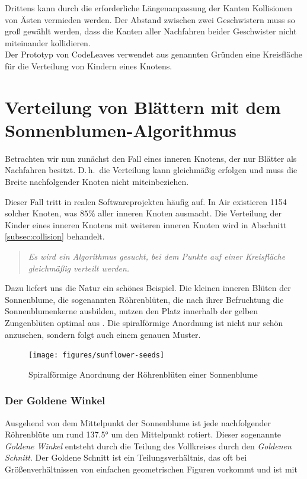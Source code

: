 Drittens kann durch die erforderliche Längenanpassung der Kanten Kollisionen von Ästen vermieden werden. Der Abstand zwischen zwei Geschwistern muss so groß gewählt werden, dass die Kanten aller Nachfahren beider Geschwister nicht miteinander kollidieren.\\

Der Prototyp von CodeLeaves verwendet aus genannten Gründen eine Kreisfläche für die Verteilung von Kindern eines Knotens.

\section{Verteilung von Blättern mit dem Sonnenblumen-Algorithmus}
\label{sec:sunflower}

Betrachten wir nun zunächst den Fall eines inneren Knotens, der nur Blätter als Nachfahren besitzt. D.\,h.\ die Verteilung kann gleichmäßig erfolgen und muss die Breite nachfolgender Knoten nicht miteinbeziehen.

Dieser Fall tritt in realen Softwareprojekten häufig auf. In Air existieren 1154 solcher Knoten, was $85\%$ aller inneren Knoten ausmacht. Die Verteilung der Kinder eines inneren Knotens mit weiteren inneren Knoten wird in Abschnitt \ref{subsec:collision} behandelt.

\begin{quote}
  \textit{Es wird ein Algorithmus gesucht, bei dem Punkte auf einer Kreisfläche gleichmäßig verteilt werden.}
\end{quote}

Dazu liefert uns die Natur ein schönes Beispiel. Die kleinen inneren Blüten der Sonnenblume, die sogenannten Röhrenblüten, die nach ihrer Befruchtung die Sonnenblumenkerne ausbilden, nutzen den Platz innerhalb der gelben Zungenblüten optimal aus \cite{zimmermann2017sonnenblume}. Die spiralförmige Anordnung ist nicht nur schön anzusehen, sondern folgt auch einem genauen Muster.

\begin{figure}[htb]
  \texttt{[image: figures/sunflower-seeds]}
  \caption{Spiralförmige Anordnung der Röhrenblüten einer Sonnenblume \cite{blender2017howto}}
  \label{fig:sunflower-seeds}
\end{figure}

\subsubsection*{Der Goldene Winkel}
Ausgehend von dem Mittelpunkt der Sonnenblume ist jede nachfolgender Röhrenblüte um rund \ang{137.5} um den Mittelpunkt rotiert. Dieser sogenannte \textit{Goldene Winkel} entsteht durch die Teilung des Vollkreises durch den \textit{Goldenen Schnitt}. Der Goldene Schnitt ist ein Teilungsverhältnis, das oft bei Größenverhältnissen von einfachen geometrischen Figuren vorkommt und ist mit


